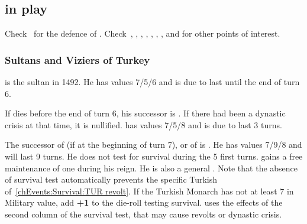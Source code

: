 
\subsection{ in play}

Check~ for the defence of
. Check~,
, ,
, ,
, ,
 and 
for other points of interest.

\subsubsection{Sultans and Viziers of Turkey}
 is the sultan in 1492. He has
values 7/5/6 and is due to last until the end of turn 6.

 If  dies before
the end of turn 6, his successor is . If there had
been a dynastic crisis at that time, it is nullified. 
has values 7/5/8 and is due to last 3 turns.

 The successor of  (if at the beginning of turn 7), or of  is
. He has values 7/9/8 and will last 9 turns. He does
not test for survival during the 5 first turns. \TUR gains a free
maintenance of one \ARMY\faceplus \Janissaire during his reign. He is
also a general .
\bparag Note that the absence of survival test automatically prevents the
specific Turkish \REVOLT of~\ref{chEvents:Survival:TUR revolt}.
 If the Turkish
Monarch has not at least 7 in Military value, add {\bf +1} to the
die-roll testing survival.
\bparag \TUR uses the effects of the second column of the survival test,
that may cause revolts or dynastic crisis.

